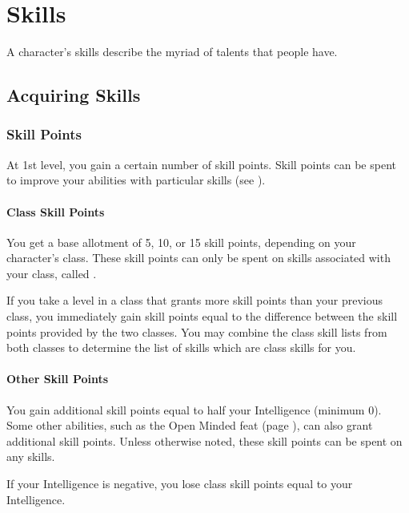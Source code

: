 \chapter{Skills}\label{Skills}

A character's skills describe the myriad of talents that people have.

\section{Acquiring Skills}

    \subsection{Skill Points}

        At 1st level, you gain a certain number of skill points. Skill points can be spent to improve your abilities with particular skills (see ).

        \subsubsection{Class Skill Points}

            You get a base allotment of 5, 10, or 15 skill points, depending on your character's class. These skill points can only be spent on skills associated with your class, called .

             If you take a level in a class that grants more skill points than your previous class, you immediately gain skill points equal to the difference between the skill points provided by the two classes. You may combine the class skill lists from both classes to determine the list of skills which are class skills for you.

        \subsubsection{Other Skill Points}

            You gain additional skill points equal to half your Intelligence (minimum 0).  Some other abilities, such as the Open Minded feat (page ), can also grant additional skill points. Unless otherwise noted, these skill points can be spent on any skills.

             If your Intelligence is negative, you lose class skill points equal to your Intelligence.

